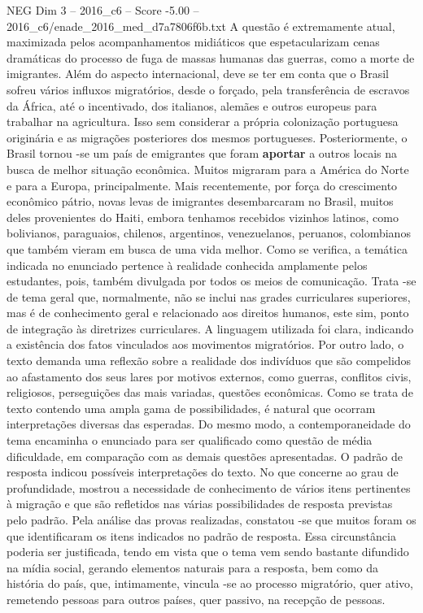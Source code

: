 \begin{textsample}{NEG Dim 3 – 2016\_c6 – Score -5.00 – 2016\_c6/enade\_2016\_med\_d7a7806f6b.txt}
A questão é extremamente atual, maximizada pelos acompanhamentos midiáticos que espetacularizam cenas dramáticas do processo de fuga de massas humanas das guerras, como a morte de imigrantes.
Além do aspecto internacional, deve se ter em conta que o Brasil sofreu vários influxos migratórios, desde o forçado, pela transferência de escravos da África, até o incentivado, dos italianos, alemães e outros europeus para trabalhar na agricultura.
Isso sem considerar a própria colonização portuguesa originária e as migrações posteriores dos mesmos portugueses.
Posteriormente, o Brasil tornou -se um país de emigrantes que foram \textbf{aportar} a outros locais na busca de melhor situação econômica.
Muitos migraram para a América do Norte e para a Europa, principalmente.
Mais recentemente, por força do crescimento econômico pátrio, novas levas de imigrantes desembarcaram no Brasil, muitos deles provenientes do Haiti, embora tenhamos recebidos vizinhos latinos, como bolivianos, paraguaios, chilenos, argentinos, venezuelanos, peruanos, colombianos que também vieram em busca de uma vida melhor.
Como se verifica, a temática indicada no enunciado pertence à realidade conhecida amplamente pelos estudantes, pois, também divulgada por todos os meios de comunicação.
Trata -se de tema geral que, normalmente, não se inclui nas grades curriculares superiores, mas é de conhecimento geral e relacionado aos direitos humanos, este sim, ponto de integração às diretrizes curriculares.
A linguagem utilizada foi clara, indicando a existência dos fatos vinculados aos movimentos migratórios.
Por outro lado, o texto demanda uma reflexão sobre a realidade dos indivíduos que são compelidos ao afastamento dos seus lares por motivos externos, como guerras, conflitos civis, religiosos, perseguições das mais variadas, questões econômicas.
Como se trata de texto contendo uma ampla gama de possibilidades, é natural que ocorram interpretações diversas das esperadas.
Do mesmo modo, a contemporaneidade do tema encaminha o enunciado para ser qualificado como questão de média dificuldade, em comparação com as demais questões apresentadas.
O padrão de resposta indicou possíveis interpretações do texto.
No que concerne ao grau de profundidade, mostrou a necessidade de conhecimento de vários itens pertinentes à migração e que são refletidos nas várias possibilidades de resposta previstas pelo padrão.
Pela análise das provas realizadas, constatou -se que muitos foram os que identificaram os itens indicados no padrão de resposta.
Essa circunstância poderia ser justificada, tendo em vista que o tema vem sendo bastante difundido na mídia social, gerando elementos naturais para a resposta, bem como da história do país, que, intimamente, vincula -se ao processo migratório, quer ativo, remetendo pessoas para outros países, quer passivo, na recepção de pessoas.

\end{textsample}

